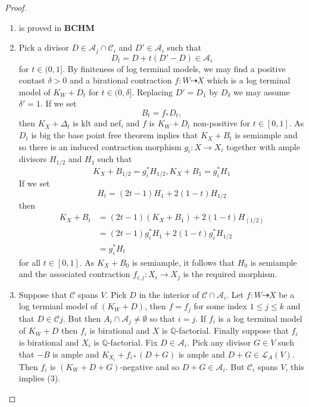 \documentclass{article}
\begin{document}
\begin{proof}
  \begin{enumerate}[1)]
    \item is proved in \textbf{BCHM}
    \item Pick a divisor $D \in \mathcal{A}_{j} \cap \mathcal{C}_{i}$ and $D' \in \mathcal{A}_{i}$ such that
      \[
        D_{t}=D+t(D'-D) \in \mathcal{A}_{i} 
      \]
      for $t \in (0,1]$. By finiteness of log terminal models, we may find a positive contast $\delta>0 $ and a birational contraction $
      f: W \dashrightarrow X$ which is a log terminal model of $K_{W}+D_{t}$ for  $t \in (0,\delta]$. Replacing $D'=D_{1}$ by $D_{\delta}$ we may assume $\delta'=1$. If we set 
      \[
        B_{t}=f_*D_{t}
      ,\]
      then $K_{X}+\Delta_{t}$ is klt and nef, and $f$ is $K_{W}+D_{t}$ non-positive for $t \in [0,1]$. As $D_{t}$ is big the base point free theorem inplies that $K_{X}+B_{t}$ is semiample and so there is an induced contraction morphism $g_i: X \to X_{i}$ together with ample divisors $H_{1/2}$ and $H_{1}$ such that 
      \[
        K_{X}+B_{1/2} =g_{i}^*H_{1/2},  K_{X}+B_{1} =g_{i}^*H_{1}
      \]
      If we set 
      \[
        H_{t}=(2t-1)H_1 +2(1-t)H_{1/2}
      \]
      then 
      \[
        \begin{aligned}
          K_{X}+B_{t}&=(2t-1)(K_{X}+B_{1})+2(1-t)H_{(1/2)}\\
                     &=(2t-1)g_{i}^*H_{1}+2(1-t)g_{i}^*H_{1/2}\\ 
                     &=g_{i}^*H_{t}
        \end{aligned}
      \]
      for all $t \in [0,1]$. As $K_{X}+B_{0}$ is semiample, it follows that $H_{0}$ is semiample and the associated contraction $f_{i,j}:X_{i}\to X_{j}$ is the required morphism.  
    \item Suppose that $\mathcal{C}$ spans $V$. Pick $D$ in the interior of $\mathcal{C} \cap \mathcal{A}_{i}$. Let $f:W \dashrightarrow  X$ be a log termianl model of $(K_{W}+D)$, then $f=f_{j}$ for some index $1\leqslant j\leqslant k$ and that $D \in \mathcal{C}j$. But then $A_{i} \cap \mathcal{A}_{j}\neq \emptyset$ so that $i=j$. If $f_{i}$ is a log terminal model of $K_{W}+D$ then $f_{i}$ is birational and $X$ is $\mathbb{Q}$-factorial. Finally suppose that $f_{i}$ is birational and $X_{i}$ is $\mathbb{Q}$-factorial. Fix $D \in \mathcal{A}_{i}$. Pick any divisor $G \in V$ such that $-B$ is ample and $K_{X_{i}}+
f_{i*}(D+G)$ is ample and $D+G \in \mathcal{L}_{A}(V)$. Then $f_{i}$ is $(K_{W}+D+G)$-negative and so $D+G \in \mathcal{A}_{i}$. But $\mathcal{C}_{i}$ spans $V$, this implies (3).

\end{enumerate}
\end{proof}
\end{document}

